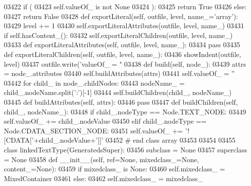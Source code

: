 \begin{DoxyCode}
{{{{{{{{{{{{{{{{{{{{{{{{{{{{{{{{{{{{{{{{{{{{{{{{{{{{{{{{{{{{{{{{{{{{{{{{{{{{{{{{{{{{{{{{{{{{{{{{{{{{{{{{{{{{{{{{{{{{{{{{{{{{{{{{{{{{{{{{{{{{{{{{{{{{{{{{{{{{{{{{{{{{{{{{{{{{{{{{{{{{{{{{{{{{{{{{{{{{{{{{{{{{{{{{{{{{{{{{{{{{{{{{{{{03422         \textcolor{keywordflow}{if} (
03423             self.valueOf_ \textcolor{keywordflow}{is} \textcolor{keywordflow}{not} \textcolor{keywordtype}{None}
03424             ):
03425             \textcolor{keywordflow}{return} \textcolor{keyword}{True}
03426         \textcolor{keywordflow}{else}:
03427             \textcolor{keywordflow}{return} \textcolor{keyword}{False}
03428     \textcolor{keyword}{def }exportLiteral(self, outfile, level, name\_='array'):
03429         level += 1
03430         self.exportLiteralAttributes(outfile, level, name\_)
03431         \textcolor{keywordflow}{if} self.hasContent_():
03432             self.exportLiteralChildren(outfile, level, name\_)
03433     \textcolor{keyword}{def }exportLiteralAttributes(self, outfile, level, name\_):
03434         \textcolor{keywordflow}{pass}
03435     \textcolor{keyword}{def }exportLiteralChildren(self, outfile, level, name\_):
03436         showIndent(outfile, level)
03437         outfile.write(\textcolor{stringliteral}{'valueOf\_ = "%
03438     \textcolor{keyword}{def }build(self, node\_):
03439         attrs = node\_.attributes
03440         self.buildAttributes(attrs)
03441         self.valueOf_ = \textcolor{stringliteral}{''}
03442         \textcolor{keywordflow}{for} child\_ \textcolor{keywordflow}{in} node\_.childNodes:
03443             nodeName\_ = child\_.nodeName.split(\textcolor{stringliteral}{':'})[-1]
03444             self.buildChildren(child\_, nodeName\_)
03445     \textcolor{keyword}{def }buildAttributes(self, attrs):
03446         \textcolor{keywordflow}{pass}
03447     \textcolor{keyword}{def }buildChildren(self, child\_, nodeName\_):
03448         \textcolor{keywordflow}{if} child\_.nodeType == Node.TEXT\_NODE:
03449             self.valueOf\_ += child\_.nodeValue
03450         \textcolor{keywordflow}{elif} child\_.nodeType == Node.CDATA\_SECTION\_NODE:
03451             self.valueOf\_ += \textcolor{stringliteral}{'![CDATA['}+child\_.nodeValue+\textcolor{stringliteral}{']]'}
03452 \textcolor{comment}{# end class array}
03453 
03454 
03455 \textcolor{keyword}{class }linkedTextType(GeneratedsSuper):
03456     subclass = \textcolor{keywordtype}{None}
03457     superclass = \textcolor{keywordtype}{None}
03458     \textcolor{keyword}{def }__init__(self, ref=None, mixedclass\_=None, content\_=None):
03459         \textcolor{keywordflow}{if} mixedclass\_ \textcolor{keywordflow}{is} \textcolor{keywordtype}{None}:
03460             self.mixedclass_ = MixedContainer
03461         \textcolor{keywordflow}{else}:
03462             self.mixedclass_ = mixedclass\_
}}}}}}}}}}}}}}}}}}}}}}}}}}}}}}}}}}}}}}}}}}}}}}}}}}}}}}}}}}}}}}}}}}}}}}}}}}}}}}}}}}}}}}}}}}}}}}}}}}}}}}}}}}}}}}}}}}}}}}}}}}}}}}}}}}}}}}}}}}}}}}}}}}}}}}}}}}}}}}}}}}}}}}}}}}}}}}}}}}}}}}}}}}}}}}}}}}}}}}}}}}}}}}}}}}}}}}}}}}}}}}}}}}}}
\end{DoxyCode}
